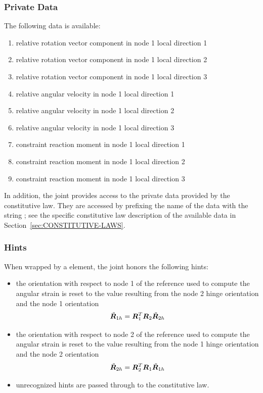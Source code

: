 \subsubsection{Private Data}
The following data is available:
\begin{enumerate}
\item {} relative rotation vector component in node 1 local direction 1
\item {} relative rotation vector component in node 1 local direction 2
\item {} relative rotation vector component in node 1 local direction 3
\item {} relative angular velocity in node 1 local direction 1
\item {} relative angular velocity in node 1 local direction 2
\item {} relative angular velocity in node 1 local direction 3
\item {} constraint reaction moment in node 1 local direction 1
\item {} constraint reaction moment in node 1 local direction 2
\item {} constraint reaction moment in node 1 local direction 3
\end{enumerate}
In addition, the joint provides
access to the private data provided by the constitutive law.
They are accessed by prefixing the name of the data with the string
; see the specific constitutive law
description of the available data in Section~\ref{sec:CONSTITUTIVE-LAWS}.

\subsubsection{Hints}
When wrapped by a  element, the 
joint honors the following hints:
\begin{itemize}
\item {} the orientation with respect to node 1
of the reference used to compute the angular strain is reset
to the value resulting from the node 2 hinge orientation
and the node 1 orientation
\begin{displaymath}
	\tilde{\boldsymbol{R}}_{1h} = \boldsymbol{R}_1^T \boldsymbol{R}_2 \tilde{\boldsymbol{R}}_{2h}
\end{displaymath}
\item {} the orientation with respect to node 2
of the reference used to compute the angular strain is reset
to the value resulting from the node 1 hinge orientation
and the node 2 orientation
\begin{displaymath}
	\tilde{\boldsymbol{R}}_{2h} = \boldsymbol{R}_2^T \boldsymbol{R}_1 \tilde{\boldsymbol{R}}_{1h}
\end{displaymath}
\item unrecognized hints are passed through to the constitutive law.
\end{itemize}


